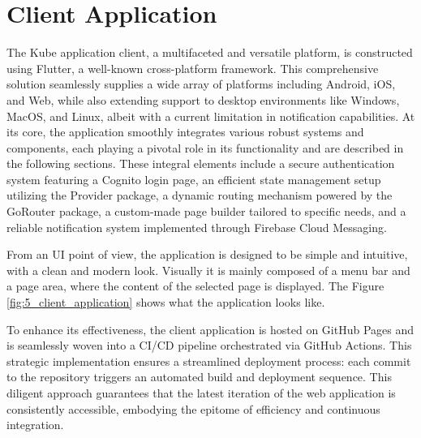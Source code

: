 \section{Client Application}
The Kube application client, a multifaceted and versatile platform, is constructed using Flutter, a
well-known cross-platform framework. This comprehensive solution seamlessly supplies a wide array of
platforms including Android, iOS, and Web, while also extending support to desktop environments like
Windows, MacOS, and Linux, albeit with a current limitation in notification capabilities. At its
core, the application smoothly integrates various robust systems and components, each playing a
pivotal role in its functionality and are described in the following sections. These integral
elements include a secure authentication system featuring a Cognito login page, an efficient state
management setup utilizing the Provider package, a dynamic routing mechanism powered by the GoRouter
package, a custom-made page builder tailored to specific needs, and a reliable notification system
implemented through Firebase Cloud Messaging.


From an UI point of view, the application is designed to be simple and intuitive, with a clean and
modern look. Visually it is mainly composed of a menu bar and a page area, where the content of the
selected page is displayed. The Figure \ref{fig:5_client_application} shows what the application
looks like.


To enhance its effectiveness, the client application is hosted on GitHub Pages and is seamlessly
woven into a CI/CD pipeline orchestrated via GitHub Actions. This strategic implementation ensures a
streamlined deployment process: each commit to the repository triggers an automated build and
deployment sequence. This diligent approach guarantees that the latest iteration of the web
application is consistently accessible, embodying the epitome of efficiency and continuous
integration.

